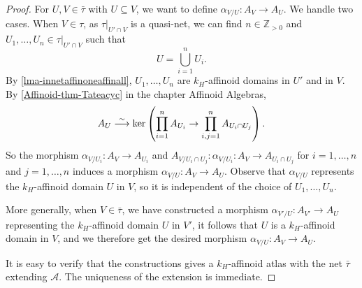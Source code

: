 \begin{proof}
    For $U,V\in \bar{\tau}$ with $U\subseteq V$, we want to define $\alpha_{V/U}:A_V\rightarrow A_U$. We handle two cases. When $V\in \tau$, as $\tau|_{U'\cap V}$ is a quasi-net, we can find $n\in \mathbb{Z}_{>0}$ and $U_1,\ldots,U_n\in \tau|_{U'\cap V}$ such that
    \[
        U=\bigcup_{i=1}^n U_i.  
    \]
    By \cref{lma-innetaffinoneaffinall}, $U_1,\ldots,U_n$ are $k_H$-affinoid domains in $U'$ and in $V$. By \cref{Affinoid-thm-Tateacyc} in the chapter Affinoid Algebras,
    \[
        A_U\stackrel{\sim}{\longrightarrow} \ker \left( \prod_{i=1}^n A_{U_i}\rightarrow \prod_{i,j=1}^n A_{U_i\cap U_j} \right).  
    \]
    So the morphism $\alpha_{V/U_i}:A_V\rightarrow A_{U_i}$ and $A_{V/U_{i}\cap U_j}:\alpha_{V/U_i}:A_V\rightarrow A_{U_i\cap U_j}$ for $i=1,\ldots,n$ and $j=1,\ldots,n$ induces a morphism $\alpha_{V/U}:A_V\rightarrow A_U$. Observe that $\alpha_{V/U}$ represents the $k_H$-affinoid domain $U$ in $V$, so it is independent of the choice of $U_1,\ldots,U_n$.

    More generally, when $V\in \bar{\tau}$, we have constructed a morphism $\alpha_{V'/U}:A_{V'}\rightarrow A_U$ representing the $k_H$-affinoid domain $U$ in $V'$, it follows that $U$ is a $k_H$-affinoid domain in $V$, and we therefore get the desired morphism $\alpha_{V/U}:A_V\rightarrow A_U$.

    It is easy to verify that the constructions gives a $k_H$-affinoid atlas with the net $\bar{\tau}$ extending $\mathcal{A}$. The uniqueness of the extension is immediate.
\end{proof}

